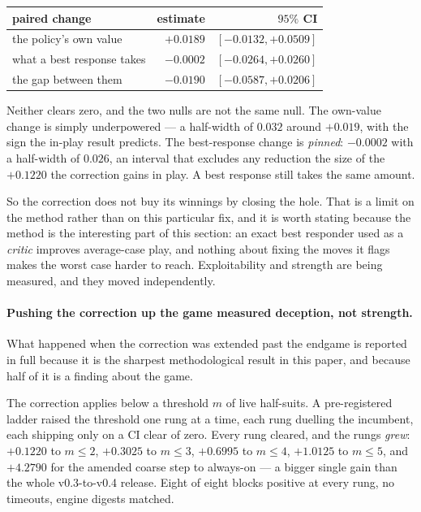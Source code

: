 \documentclass[11pt,a4paper]{article}
\begin{document}
\begin{center}
\begin{tabular}{lrr}
\toprule
paired change & estimate & $95\%$ CI \\
\midrule
the policy's own value & $+0.0189$ & $[-0.0132, +0.0509]$ \\
what a best response takes & $-0.0002$ & $[-0.0264, +0.0260]$ \\
the gap between them & $-0.0190$ & $[-0.0587, +0.0206]$ \\
\bottomrule
\end{tabular}
\end{center}

Neither clears zero, and the two nulls are not the same null. The own-value
change is simply underpowered --- a half-width of $0.032$ around $+0.019$, with
the sign the in-play result predicts. The best-response change is
\emph{pinned}: $-0.0002$ with a half-width of $0.026$, an interval that
excludes any reduction the size of the $+0.1220$ the correction gains in play.
A best response still takes the same amount.

So the correction does not buy its winnings by closing the hole. That is a
limit on the method rather than on this particular fix, and it is worth stating
because the method is the interesting part of this section: an exact best
responder used as a \emph{critic} improves average-case play, and nothing about
fixing the moves it flags makes the worst case harder to reach. Exploitability
and strength are being measured, and they moved independently.

\paragraph{Pushing the correction up the game measured deception, not strength.}
What happened when the correction was extended past the endgame is reported in
full because it is the sharpest methodological result in this paper, and
because half of it is a finding about the game.

The correction applies below a threshold $m$ of live half-suits. A
pre-registered ladder raised the threshold one rung at a time, each rung
duelling the incumbent, each shipping only on a CI clear of zero. Every rung
cleared, and the rungs \emph{grew}: $+0.1220$ to $m \le 2$, $+0.3025$ to
$m \le 3$, $+0.6995$ to $m \le 4$, $+1.0125$ to $m \le 5$, and $+4.2790$ for
the amended coarse step to always-on --- a bigger single gain than the whole
v0.3-to-v0.4 release. Eight of eight blocks positive at every rung, no
timeouts, engine digests matched.
\end{document}
